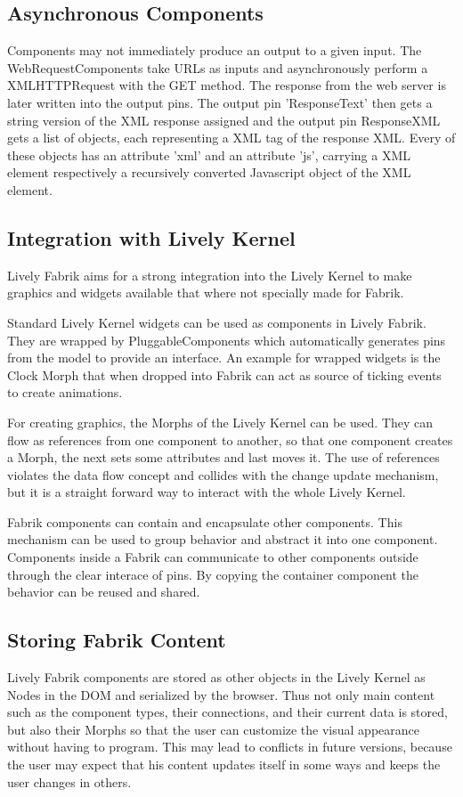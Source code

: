 \documentclass[pdftex, times, 10pt, twocolumn]{article}
\begin{document}
\subsection{Asynchronous Components}
Components may not immediately produce an output to a given input. The WebRequestComponents take URLs as inputs and asynchronously perform a XMLHTTPRequest with the GET method. The response from the web server is later written into the output pins. The output pin 'ResponseText' then gets a string version of the XML response assigned and the output pin ResponseXML gets a list of objects, each representing a XML tag of the response XML. Every of these objects has an attribute 'xml' and an attribute 'js', carrying a XML element respectively a recursively converted Javascript object of the XML element. 



\subsection{Integration with Lively Kernel}
Lively Fabrik aims for a strong integration into the Lively Kernel to make graphics and widgets available that where not specially made for Fabrik.  

Standard Lively Kernel widgets can be used as components in Lively Fabrik. They are wrapped by PluggableComponents which automatically generates pins from the model to provide an interface. An example for wrapped widgets is the Clock Morph that when dropped into Fabrik can act as source of ticking events to create animations. 

For creating graphics, the Morphs of the Lively Kernel can be used. They can flow as references from one component to another, so that one component creates a Morph, the next sets some attributes and last moves it. The use of references violates the data flow concept and collides with the change update mechanism, but it is a straight forward way to interact with the whole Lively Kernel. 

Fabrik components can contain and encapsulate other components. This mechanism can be used to group behavior and abstract it into one component. Components inside a Fabrik can communicate to other components outside through the clear interace of pins. By copying the container component the behavior can be reused and shared. 



\subsection{Storing Fabrik Content}
Lively Fabrik components are stored as other objects in the Lively Kernel as Nodes in the DOM and serialized by the browser. Thus not only main content such as the component types, their connections, and their current data is stored, but also their Morphs so that the user can customize the visual appearance without having to program. This may lead to conflicts in future versions, because the user may expect that his content updates itself in some ways and keeps the user changes in others.  
\end{document}

